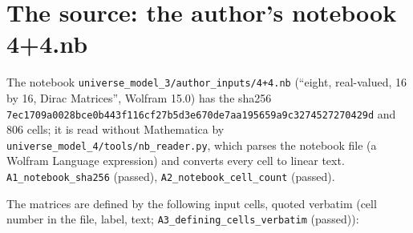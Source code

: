\documentclass[
  10pt,
]{article}
\begin{document}
\hypertarget{the-source-the-authors-notebook-44.nb}{%
\section{The source: the author's notebook
4+4.nb}\label{the-source-the-authors-notebook-44.nb}}

The notebook \texttt{universe\_model\_3/author\_inputs/4+4.nb} (``eight,
real-valued, 16 by 16, Dirac Matrices'', Wolfram 15.0) has the sha256
\texttt{7ec1709a0028bce0b443f116cf27b5d3e670de7aa195659a9c3274527270429d}
and 806 cells; it is read without Mathematica by
\texttt{universe\_model\_4/tools/nb\_reader.py}, which parses the
notebook file (a Wolfram Language expression) and converts every cell to
linear text. \texttt{A1\_notebook\_sha256} (passed),
\texttt{A2\_notebook\_cell\_count} (passed).

The matrices are defined by the following input cells, quoted verbatim
(cell number in the file, label, text;
\texttt{A3\_defining\_cells\_verbatim} (passed)):
\end{document}
